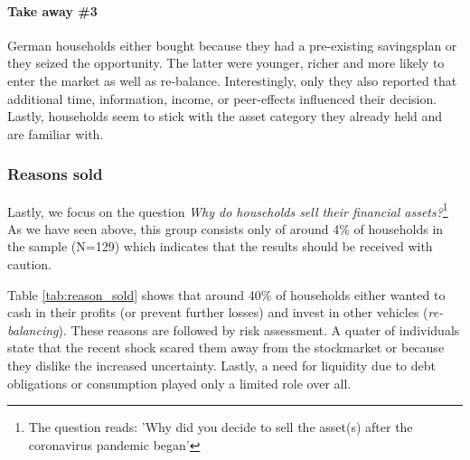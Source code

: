 \documentclass[ProjectABM]{subfiles}
\begin{document}


\paragraph{Take away \#3}
German households either bought because they had a pre-existing savingsplan or they seized the opportunity. The latter were younger, richer and more likely to enter the market as well as re-balance. Interestingly, only they also reported that additional time, information, income, or peer-effects influenced their decision. Lastly, households seem to stick with the asset category they already held and are familiar with.

\subsubsection{Reasons sold}
Lastly, we focus on the question \textit{Why do households sell their financial assets?}\footnote{The question reads: 'Why did you decide to sell the asset(s) after the coronavirus pandemic began'} As we have seen above, this group consists only of around 4\% of households in the sample (N=129) which indicates that the results should be received with caution.



Table \ref{tab:reason_sold} shows that around 40\% of households either wanted to cash in their profits (or prevent further losses) and invest in other vehicles (\textit{re-balancing}). These reasons are followed by risk assessment. A quater of individuals state that the recent shock scared them away from the stockmarket or because they dislike the increased uncertainty. Lastly, a need for liquidity due to debt obligations or consumption played only a limited role over all. %


\end{document}
